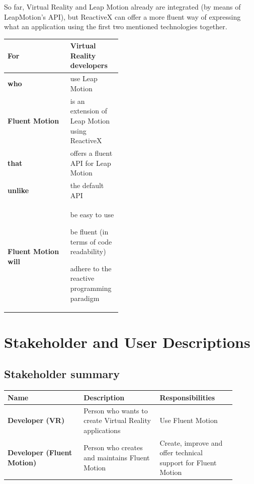 \documentclass[12pt,a4paper,twoside]{report}
\begin{document}
So far, Virtual Reality and Leap Motion already are integrated (by means of LeapMotion’s API), but ReactiveX can offer a more fluent way of expressing what an application using the first two mentioned technologies together. 

\begin{table}[h]
  \centering
  \begin{tabular}{| g | m{0.45\linewidth} |}
    \hline
    \textbf{For} & Virtual Reality developers \\
    \hline
    \textbf{who} & use Leap Motion \\
    \hline
    \textbf{Fluent Motion} & is an extension of Leap Motion using ReactiveX \\
    \hline
    \textbf{that} & offers a fluent API for Leap Motion \\
    \hline
    \textbf{unlike} & the default API \\
    \hline
    \textbf{Fluent Motion will} &
      be easy to use    
      
      be fluent (in terms of code readability)

      adhere to the reactive programming paradigm \\
    \hline
  \end{tabular}
  \label{table:problem_statement}
\end{table}

\section{Stakeholder and User Descriptions}

\subsection{Stakeholder summary}

\begin{table}[h]
  \centering
  \begin{tabular}{| m{0.3\linewidth} | m{0.3\linewidth} | m{0.3\linewidth} |}
    \hline
    \rowcolor{lightgray} Name & Description & Responsibilities \\
    \hline
    \textbf{Developer (VR)} & Person who wants to create Virtual Reality applications & Use Fluent Motion \\
    \hline
    \textbf{Developer (Fluent Motion)} & Person who creates and maintains Fluent Motion & Create, improve and offer technical support for Fluent Motion \\
    \hline
  \end{tabular}
\end{table}
\end{document}
